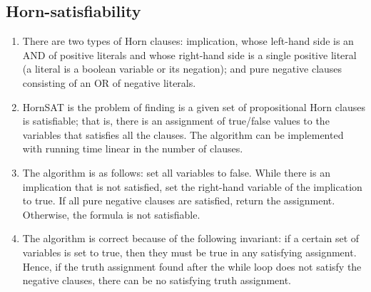 \documentclass[10pt]{article}
\begin{document}
\begin{multicols}{2}
\begin{addmargin}[0.8em]{0.5em}
    \subsection{Horn-satisfiability}
    \begin{enumerate}[label=(\alph*)]
        \item There are two types of Horn clauses: implication, whose left-hand side is an AND of  positive literals and whose right-hand side is a single positive literal (a literal is a boolean variable or its negation); and pure negative clauses consisting of an OR of negative literals.
        \item HornSAT is the problem of finding is a given set of propositional Horn clauses is satisfiable; that is, there is an assignment of true/false values to the variables that satisfies all the clauses. The algorithm can be implemented with running time linear in the number of clauses.
        \item The algorithm is as follows: set all variables to false. While there is an implication that is not satisfied, set the right-hand variable of the implication to true. If all pure negative clauses are satisfied, return the assignment. Otherwise, the formula is not satisfiable.
        \item The algorithm is correct because of the following invariant: if a certain set of variables is set to true, then they must be true in any satisfying assignment. Hence, if the truth assignment found after the while loop does not satisfy the negative clauses, there can be no satisfying truth assignment.
    \end{enumerate}
    

\end{addmargin}
\end{multicols}
\end{document}
